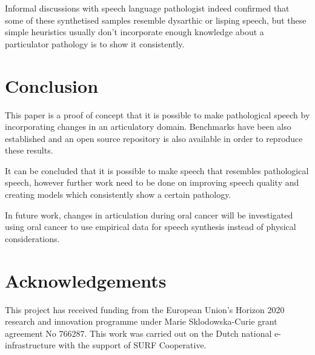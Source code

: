 \documentclass[a4paper]{article}
\begin{document}
Informal discussions with speech language pathologist indeed confirmed
that some of these synthetised samples resemble dysarthic or lisping speech,
but these simple heuristics usually don't incorporate enough knowledge
about a particulator pathology is to show it consistently.
\section{Conclusion}

This paper is a proof of concept that it is possible to make pathological
speech by incorporating changes in an articulatory domain. Benchmarks
have been also established and an open source repository is also available
in order to reproduce these results. 

It can be concluded that it is possible to make speech that resembles
pathological speech, however further work need to be done on improving
speech quality and creating models which consistently show a certain
pathology.

In future work, changes in articulation during oral cancer will be
investigated using oral cancer to use empirical data for speech synthesis
instead of physical considerations.

\section{Acknowledgements}
This project has received funding from the European Union's Horizon
2020 research and innovation programme under Marie Sklodowska-Curie
grant agreement No 766287.
This work was carried out on the Dutch national e-infrastructure with the support of SURF Cooperative.




\end{document}
